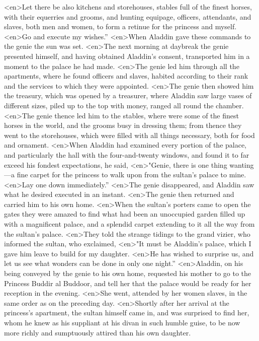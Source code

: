 <en>Let there be also kitchens and storehouses, stables full of the finest horses, with their equerries and grooms, and hunting equipage, officers, attendants, and slaves, both men and women, to form a retinue for the princess and myself.
<en>Go and execute my wishes.”
<en>When Aladdin gave these commands to the genie the sun was set.
<en>The next morning at daybreak the genie presented himself, and having obtained Aladdin’s consent, transported him in a moment to the palace he had made.
<en>The genie led him through all the apartments, where he found officers and slaves, habited according to their rank and the services to which they were appointed.
<en>The genie then showed him the treasury, which was opened by a treasurer, where Aladdin saw large vases of different sizes, piled up to the top with money, ranged all round the chamber.
<en>The genie thence led him to the stables, where were some of the finest horses in the world, and the grooms busy in dressing them; from thence they went to the storehouses, which were filled with all things necessary, both for food and ornament.
<en>When Aladdin had examined every portion of the palace, and particularly the hall with the four-and-twenty windows, and found it to far exceed his fondest expectations, he said,
<en>"Genie, there is one thing wanting—a fine carpet for the princess to walk upon from the sultan’s palace to mine.
<en>Lay one down immediately.”
<en>The genie disappeared, and Aladdin saw what he desired executed in an instant.
<en>The genie then returned and carried him to his own home.
<en>When the sultan’s porters came to open the gates they were amazed to find what had been an unoccupied garden filled up with a magnificent palace, and a splendid carpet extending to it all the way from the sultan’s palace.
<en>They told the strange tidings to the grand vizier, who informed the sultan, who exclaimed,
<en>"It must be Aladdin’s palace, which I gave him leave to build for my daughter.
<en>He has wished to surprise us, and let us see what wonders can be done in only one night.”
<en>Aladdin, on his being conveyed by the genie to his own home, requested his mother to go to the Princess Buddir al Buddoor, and tell her that the palace would be ready for her reception in the evening.
<en>She went, attended by her women slaves, in the same order as on the preceding day.
<en>Shortly after her arrival at the princess’s apartment, the sultan himself came in, and was surprised to find her, whom he knew as his suppliant at his divan in such humble guise, to be now more richly and sumptuously attired than his own daughter.
